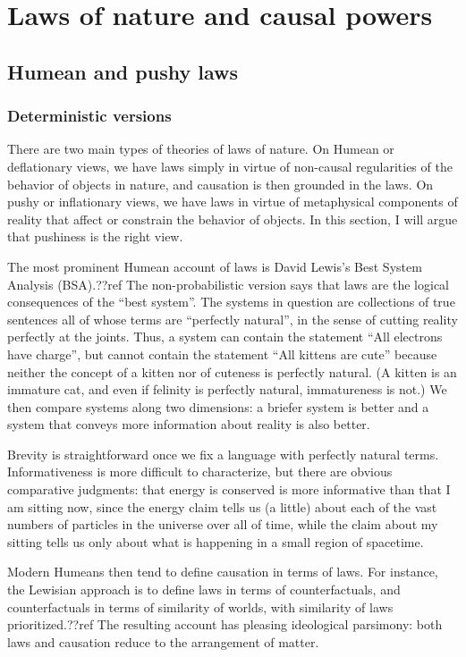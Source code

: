 \def\mychapter{VIII}


\chapter{Laws of nature and causal powers}\label{ch:laws}
\section{Humean and pushy laws}
\subsection{Deterministic versions}
There are two main types of theories of laws of nature. On Humean or deflationary views, we have laws simply in virtue of non-causal 
regularities of the behavior of objects in nature, and causation is then grounded in the laws. On pushy or inflationary views, 
we have laws in virtue of metaphysical components of reality that affect or constrain the behavior of objects. 
In this section, I will argue that pushiness is the right view. 

The most prominent Humean account of laws is David Lewis's Best System Analysis (BSA).??ref The non-probabilistic version says that laws are the 
logical consequences of the ``best system''. The systems in question are collections of true sentences all of whose terms
are ``perfectly natural'', in the sense of cutting reality perfectly at the joints. Thus, a system can contain the statement ``All electrons have charge'', but cannot contain
the statement ``All kittens are cute'' because
neither the concept of a kitten nor of cuteness is perfectly natural. (A kitten is an immature cat, and even if 
felinity is perfectly natural, immatureness is not.) We then compare systems along two dimensions:
a briefer system is better and a system that conveys more information about reality is also better.

Brevity is straightforward once we fix a language with perfectly natural terms. Informativeness is more difficult 
to characterize, but there are obvious comparative judgments: that energy is conserved is more informative than that
I am sitting now, since the energy claim tells us (a little) about each of the vast numbers of particles in the universe 
over all of time, while the claim about my sitting tells us only about what is happening in a small region of spacetime. 

Modern Humeans then tend to define causation in terms of laws. For instance, the Lewisian approach is to define laws
in terms of counterfactuals, and counterfactuals in terms of similarity of worlds, with similarity of laws prioritized.??ref
The resulting account has pleasing ideological parsimony: both laws and causation reduce to the arrangement of matter.

